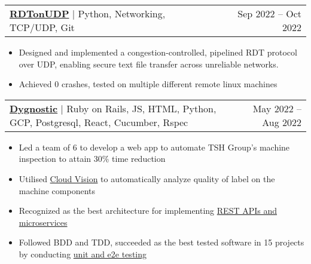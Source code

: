 \documentclass[letterpaper,11pt]{article}
\makeatletter
\newcommand{\resumeItem}[1]{
  \item\small{
    {#1 \vspace{-2.5pt}}
  }
}
\newcommand{\resumeProjectHeading}[2]{
    \item
    \begin{tabular*}{0.97\textwidth}{l@{\extracolsep{\fill}}r}
      \small#1 & \footnotesize#2 \\
    \end{tabular*}\vspace{-7pt}
}
\newcommand{\resumeItemListStart}{\begin{itemize}}
\newcommand{\resumeItemListEnd}{\end{itemize}\vspace{-5pt}}
\makeatother
\begin{document}
    

        \resumeProjectHeading
            {\textbf{{\href{https://github.com/Usgupta/RDTonUDP}{{\faLink} RDTonUDP}}} $|$ {Python, Networking, TCP/UDP, Git}}{Sep 2022 -- Oct 2022}
          \resumeItemListStart
            \resumeItem{Designed and implemented a congestion-controlled, pipelined RDT protocol over UDP, enabling secure text file transfer across unreliable networks.}
            \resumeItem{Achieved 0 crashes, tested on multiple different remote linux machines}
        
           
          \resumeItemListEnd

         
      \resumeProjectHeading          {\textbf{{\href{https://sites.google.com/view/group10dynostic}{{\faLink} Dygnostic}}} $|$ {Ruby on Rails, JS, HTML, Python, GCP, Postgresql, React, Cucumber, Rspec}}	{May 2022 -- Aug 2022}
          \resumeItemListStart
            \resumeItem{Led a team of 6 to develop a web app to automate TSH Group's machine inspection to attain 30\% time reduction}
            \resumeItem{Utilised \ul{Cloud Vision} to automatically analyze quality of label on the machine components}
            \resumeItem{Recognized as the best architecture for implementing \ul{REST APIs and microservices} }
            \resumeItem{Followed BDD and TDD, succeeded as the best tested software in 15 projects by conducting \ul{unit and e2e testing}}
          \resumeItemListEnd

          
\end{document}

